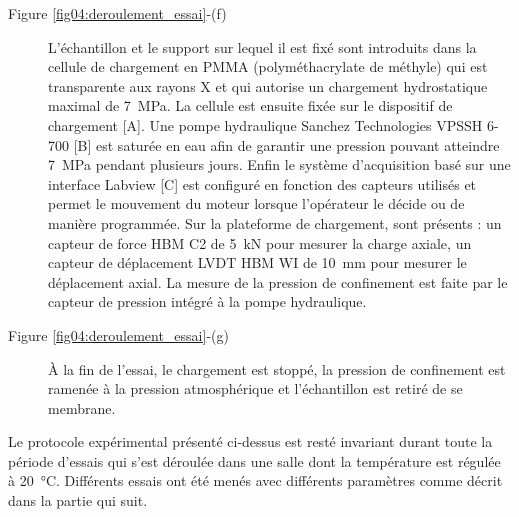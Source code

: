 \begin{description}
			\item[Figure \ref{fig04:deroulement_essai}-(f)] L'échantillon et le support sur lequel il est fixé sont introduits dans la cellule de chargement en PMMA (polyméthacrylate de méthyle) qui est transparente aux rayons X et qui autorise un chargement hydrostatique maximal de \SI{7}{\mega\pascal}. La cellule est ensuite fixée sur le dispositif de chargement [A]. Une pompe hydraulique Sanchez Technologies VPSSH 6-700 [B] est saturée en eau afin de garantir une pression pouvant atteindre \SI{7}{\mega\pascal} pendant plusieurs jours. Enfin le système d'acquisition basé sur une interface Labview [C] est configuré en fonction des capteurs utilisés et permet le mouvement du moteur lorsque l'opérateur le décide ou de manière programmée. Sur la plateforme de chargement, sont présents : un capteur de force HBM C2 de \SI{5}{\kilo\newton} pour mesurer la charge axiale, un capteur de déplacement LVDT HBM WI de \SI{10}{\milli\meter} pour mesurer le déplacement axial. La mesure de la pression de confinement est faite par le capteur de pression intégré à la pompe hydraulique.
			\item[Figure \ref{fig04:deroulement_essai}-(g)] \`A la fin de l'essai, le chargement est stoppé, la pression de confinement est ramenée à la pression atmosphérique et l'échantillon est retiré de se membrane.
		\end{description}
		Le protocole expérimental présenté ci-dessus est resté invariant durant toute la période d'essais qui s'est déroulée dans une salle dont la température est régulée à \SI{20}{\celsius}. Différents essais ont été menés avec différents paramètres comme décrit dans la partie qui suit.

